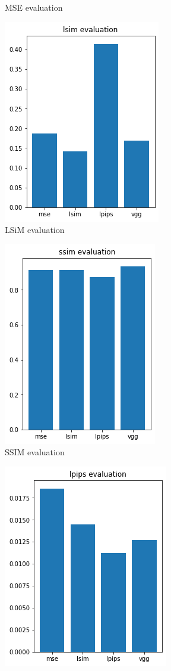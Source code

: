 \documentclass[a4paper,12pt,twoside]{report}
\begin{document}
\begin{figure}
\begin{subfigure}{0.32\textwidth}
		\caption{MSE evaluation}
	\end{subfigure}
	\begin{subfigure}{0.32\textwidth}
		\centering
		\includegraphics[scale=0.5]{autoencoder/lsimeval.png}
		\caption{LSiM evaluation}
	\end{subfigure}
	\begin{subfigure}{0.32\textwidth}
		\centering
		\includegraphics[scale=0.5]{autoencoder/ssimeval.png}
		\caption{SSIM evaluation}
	\end{subfigure}
	\begin{subfigure}{0.32\textwidth}
		\centering
		\includegraphics[scale=0.5]{autoencoder/lpipseval.png}

\end{subfigure}
\end{figure}
\end{document}
